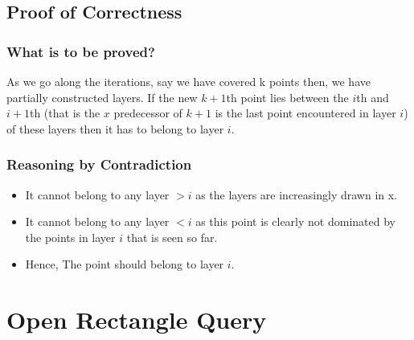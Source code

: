 \documentclass{article}
\begin{document}
\subsection{Proof of Correctness}
\subsubsection{What is to be proved?}
As we go along the iterations, say we have covered k points then, we have partially constructed layers. If the new $k+1$th point lies between the $i$th and $i+1$th (that is the $x$ predecessor of $k+1$ is the last point encountered in layer $i$) of these layers then it has to belong to layer $i$.
\subsubsection{Reasoning by Contradiction}
\begin{itemize}
\item It cannot belong to any layer $>i$ as the layers are increasingly drawn in x.
\item It cannot belong to any layer $<i$ as this point is clearly not dominated by the points in layer $i$ that is seen so far.
\item Hence, The point should belong to layer $i$.
\end{itemize}

\newpage
\section{ Open Rectangle Query }
\end{document}
